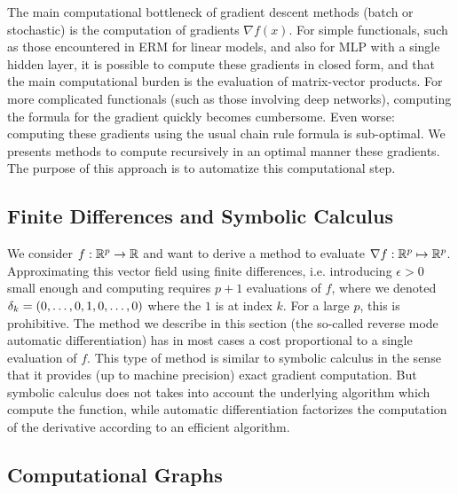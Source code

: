 



The main computational bottleneck of gradient descent methods (batch or stochastic) is the computation of gradients $\nabla f(x)$. For simple functionals, such as those encountered in ERM for linear models, and also for MLP with a single hidden layer, it is possible to compute these gradients in closed form, and that the main computational burden is the evaluation of matrix-vector products. For more complicated functionals (such as those involving deep networks), computing the formula for the gradient quickly becomes cumbersome. Even worse: computing these gradients using the usual chain rule formula is sub-optimal. We presents methods to compute recursively in an optimal manner these gradients. The purpose of this approach is to automatize this computational step.  

\subsection{Finite Differences and Symbolic Calculus}

We consider $f : \mathbb{R}^p \rightarrow \mathbb{R}$ and want to derive a method to evaluate $\nabla f : \mathbb{R}^p \mapsto \mathbb{R}^p$. Approximating this vector field using finite differences, i.e. introducing $\epsilon>0$ small enough and computing 
requires $p+1$ evaluations of $f$, where we denoted $\delta_k=(0,\ldots,0,1,0,\ldots,0)$ where the $1$ is at index $k$. 
%
For a large $p$, this is prohibitive. The method we  describe in this section (the so-called reverse mode automatic differentiation) has in most cases a cost proportional to a single evaluation of $f$. 
%
This type of method is similar to symbolic calculus in the sense that it provides (up to machine precision) exact gradient computation. But symbolic calculus does not takes into account the underlying algorithm which compute the function, while automatic differentiation factorizes the computation of the derivative according to an efficient algorithm.


\subsection{Computational Graphs}


